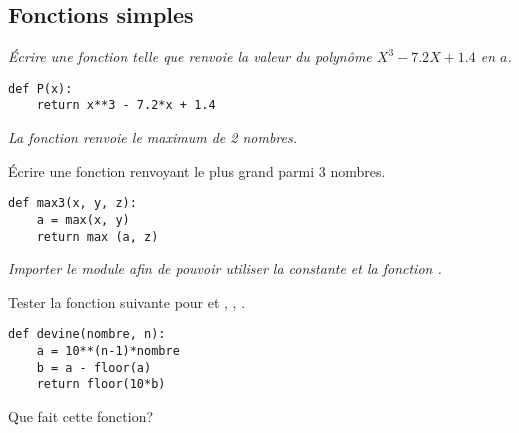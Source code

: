 \subsection{Fonctions simples} 
\begin{Exercise}[title={Polynôme},label=exo:poly]
\it Écrire une fonction  telle que  renvoie la valeur du polynôme $X^3-7.2 X + 1.4$ en $a$.
\end{Exercise}
\begin{Answer}
\begin{lstlisting}
def P(x):
    return x**3 - 7.2*x + 1.4
\end{lstlisting}
\end{Answer} 
\begin{Exercise}[title={Maximum}]
\it La fonction  renvoie le maximum de 2 nombres.

Écrire une fonction  renvoyant le plus grand parmi $3$ nombres. 
\end{Exercise}
\begin{Answer}
\begin{lstlisting}
def max3(x, y, z):
    a = max(x, y) 
    return max (a, z)
\end{lstlisting}
\end{Answer} 
\begin{Exercise}[title={Devinette}]
\it Importer le module  afin de pouvoir utiliser la constante  et la fonction .

Tester la fonction suivante pour  et , , .
\begin{lstlisting}
def devine(nombre, n):
    a = 10**(n-1)*nombre
    b = a - floor(a)
    return floor(10*b)
\end{lstlisting}
Que fait cette fonction?
\end{Exercise} 
